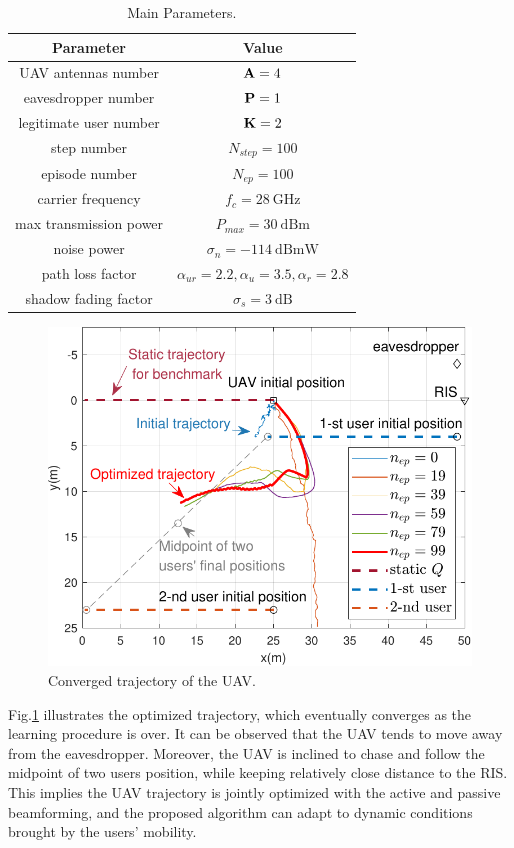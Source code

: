 \documentclass[journal]{IEEEtran}
\begin{document}
\begin{table}
  \centering
  \caption{Main Parameters.}
  \begin{tabular}{cc} 
  \toprule
  Parameter              & Value    \\ 
  \hline
  UAV antennas number    &${\bf{A}}=4$        \\
  eavesdropper number    &${\bf{P}} = 1$        \\
legitimate user number &${\bf{K}} =2$        \\
  step number            & $N_{step}=100$      \\
  episode number         & $N_{ep}=100$      \\
  carrier frequency      &$f_c=28\ \text{GHz}$\\
  max transmission power            &$P_{max }= 30\ \text{dBm}$  \\
  noise power            &$\sigma_n= -114\ \text{dBmW}$  \\
  path loss factor\cite{parameters}       &    $\alpha_{ur}=2.2,\alpha_{u}=3.5,\alpha_{r}=2.8$      \\
  shadow   fading factor &$\sigma_s = 3\ \text{dB} $     \\
  \bottomrule
  \end{tabular}
\end{table}

\begin{figure}
  \centering
	\includegraphics[width=1.0\linewidth]{./plot/trajectory/trajectory.pdf}%
	\caption{Converged trajectory of the UAV.}  %
  \label{trajectory}
\end{figure}
Fig.\ref{trajectory} illustrates the optimized trajectory, which eventually converges as the learning procedure is over. It can be observed that the UAV tends to move away from the eavesdropper. Moreover, the UAV is inclined to chase and follow the midpoint of two users position, while keeping relatively close distance to the RIS. This implies the UAV trajectory is jointly optimized with the active and passive beamforming, and the proposed algorithm can adapt to dynamic conditions brought by the users' mobility.
\end{document}
